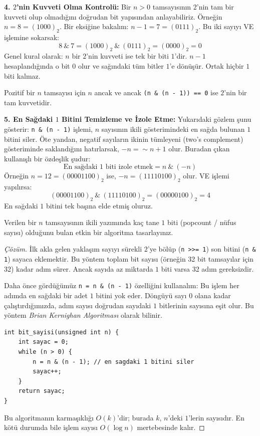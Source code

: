 \textbf{4. $2$'nin Kuvveti Olma Kontrolü:}
Bir $n > 0$ tamsayısının $2$'nin tam bir kuvveti olup olmadığını doğrudan bit yapısından anlayabiliriz.
Örneğin $n = 8 = (1000)_2$. Bir eksiğine bakalım: $n - 1 = 7 = (0111)_2$.
Bu iki sayıyı VE işlemine sokarsak:
\[
8 \ \& \ 7 = (1000)_2 \ \& \ (0111)_2 = (0000)_2 = 0
\]
Genel kural olarak: $n$ bir $2$'nin kuvveti ise tek bir biti $1$'dir. $n-1$ hesaplandığında o bit $0$ olur ve sağındaki tüm bitler $1$'e dönüşür. Ortak hiçbir $1$ biti kalmaz.
\begin{theorem}
Pozitif bir $n$ tamsayısı için $n$ ancak ve ancak \lstinline|(n & (n - 1)) == 0| ise $2$'nin bir tam kuvvetidir.
\end{theorem}

\textbf{5. En Sağdaki $1$ Bitini Temizleme ve İzole Etme:}
Yukarıdaki gözlem şunu gösterir: \lstinline|n & (n - 1)| işlemi, $n$ sayısının ikili gösterimindeki en sağda bulunan $1$ bitini siler.
Öte yandan, negatif sayıların ikinin tümleyeni (two's complement) gösteriminde saklandığını hatırlarsak, $-n = \sim n + 1$ olur. Buradan çıkan kullanışlı bir özdeşlik şudur:
\[
\text{En sağdaki } 1 \text{ biti izole etmek} = n \ \& \ (-n)
\]
Örneğin $n = 12 = (00001100)_2$ ise, $-n = (11110100)_2$ olur. VE işlemi yapılırsa:
\[
(00001100)_2 \ \& \ (11110100)_2 = (00000100)_2 = 4
\]
En sağdaki $1$ bitini tek başına elde etmiş oluruz.

\begin{example}
Verilen bir $n$ tamsayısının ikili yazımında kaç tane $1$ biti (popcount / nüfus sayısı) olduğunu bulan etkin bir algoritma tasarlayınız.
\end{example}

\begin{proof}[Çözüm]
İlk akla gelen yaklaşım sayıyı sürekli $2$'ye bölüp (\lstinline|n >>= 1|) son bitini (\lstinline|n & 1|) sayaca eklemektir. Bu yöntem toplam bit sayısı (örneğin 32 bit tamsayılar için 32) kadar adım sürer. Ancak sayıda az miktarda $1$ biti varsa 32 adım gereksizdir. 

Daha önce gördüğümüz \lstinline|n = n & (n - 1)| özelliğini kullanalım: Bu işlem her adımda en sağdaki bir adet $1$ bitini yok eder. Döngüyü sayı $0$ olana kadar çalıştırdığımızda, adım sayısı doğrudan sayıdaki $1$ bitlerinin sayısına eşit olur. Bu yöntem \emph{Brian Kernighan Algoritması} olarak bilinir.

\begin{lstlisting}[language=CTemel]
int bit_sayisi(unsigned int n) {
    int sayac = 0;
    while (n > 0) {
        n = n & (n - 1); // en sagdaki 1 bitini siler
        sayac++;
    }
    return sayac;
}
\end{lstlisting}
Bu algoritmanın karmaşıklığı $O(k)$'dir; burada $k$, $n$'deki $1$'lerin sayısıdır. En kötü durumda bile işlem sayısı $O(\log n)$ mertebesinde kalır.
\end{proof}

